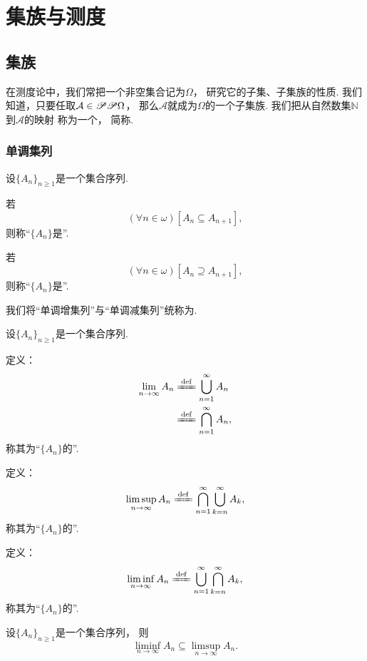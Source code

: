 \chapter{集族与测度}
\section{集族}
在测度论中，我们常把一个非空集合记为\(\Omega\)，
研究它的子集、子集族的性质.
我们知道，只要任取\(\mathcal{A} \in \mathscr{P}\mathscr{P}\Omega\)，
那么\(\mathcal{A}\)就成为\(\Omega\)的一个子集族.
我们把从自然数集\(\mathbb{N}\)到\(\mathcal{A}\)的映射
称为一个，
简称.

\subsection{单调集列}
\begin{definition}
设\(\{A_n\}_{n\geq1}\)是一个集合序列.

若\[
	(\forall n\in\omega)
	[A_n \subseteq A_{n+1}],
\]
则称“\(\{A_n\}\)是”.

若\[
	(\forall n\in\omega)
	[A_n \supseteq A_{n+1}],
\]
则称“\(\{A_n\}\)是”.

我们将“单调增集列”与“单调减集列”统称为.
\end{definition}

\begin{definition}
设\(\{A_n\}_{n\geq1}\)是一个集合序列.

定义：\begin{align*}
	\lim_{n\to\infty} A_n
	&\defeq \bigcup_{n=1}^\infty A_n \\
	&\defeq \bigcap_{n=1}^\infty A_n,
\end{align*}
称其为“\(\{A_n\}\)的”.

定义：\[
	\limsup_{n\to\infty} A_n
	\defeq
	\bigcap_{n=1}^\infty
	\bigcup_{k=n}^\infty
	A_k,
\]
称其为“\(\{A_n\}\)的”.

定义：\[
	\liminf_{n\to\infty} A_n
	\defeq
	\bigcup_{n=1}^\infty
	\bigcap_{k=n}^\infty
	A_k,
\]
称其为“\(\{A_n\}\)的”.
\end{definition}

\begin{proposition}
设\(\{A_n\}_{n\geq1}\)是一个集合序列，
则\begin{equation}
	\liminf_{n\to\infty} A_n
	\subseteq
	\limsup_{n\to\infty} A_n.
\end{equation}
\end{proposition}


